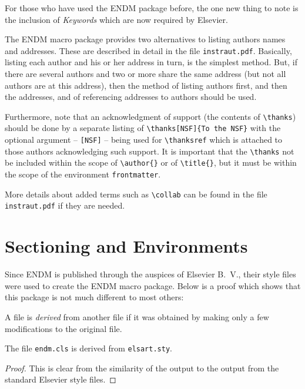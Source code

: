 \documentclass{endm}
\begin{document}
For those who have used the ENDM package before, the one new thing to
note is the inclusion of \emph{Keywords} which are now required by
Elsevier.

The ENDM macro package provides two alternatives to listing authors
names and addresses. These are described in detail in the file
\texttt{instraut.pdf}. Basically, listing each author and his or her
address in turn, is the simplest method. But, if there are several
authors and two or more share the same address (but not all authors
are at this address), then the method of listing authors first, and
then the addresses, and of referencing addresses to authors should be
used.

Furthermore, note that an acknowledgment of support (the contents of
\verb+\thanks+) should be done by a separate listing of
\verb+\thanks[NSF]{To the NSF}+ with the optional argument --
\verb+[NSF]+ -- being used for \verb+\thanksref+ which is attached to
those authors acknowledging such support. It is important that the
\verb+\thanks+ not be included within the scope of \verb+\author{}+ or
of \verb+\title{}+, but it must be within the scope of the environment
\texttt{frontmatter}.

More details about added terms such as \verb+\collab+ can be found in
the file \texttt{instraut.pdf} if they are needed.


\section{Sectioning and Environments}

Since ENDM is published through the auspices of Elsevier B.~V., their
style files were used to create the ENDM macro package. Below is a
proof which shows that this package is not much different to most
others:

\begin{definition}
A file is \emph{derived} from another file if it was obtained by making
only a few modifications to the original file.
\end{definition}

\begin{theorem}
The file \texttt{\normalshape endm.cls} is derived from
\texttt{\normalshape elsart.sty}.
\end{theorem}

\begin{proof}
This is clear from the similarity of the output to the output from the
standard Elsevier style files.
\end{proof}
\end{document}
